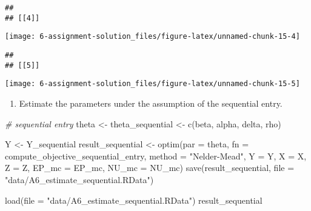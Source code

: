 \documentclass[
]{article}
\newenvironment{Shaded}{\begin{snugshade}}{\end{snugshade}}
\newcommand{\AttributeTok}[1]{\textcolor[rgb]{0.77,0.63,0.00}{#1}}
\newcommand{\CommentTok}[1]{\textcolor[rgb]{0.56,0.35,0.01}{\textit{#1}}}
\newcommand{\FunctionTok}[1]{\textcolor[rgb]{0.00,0.00,0.00}{#1}}
\newcommand{\NormalTok}[1]{#1}
\newcommand{\OtherTok}[1]{\textcolor[rgb]{0.56,0.35,0.01}{#1}}
\newcommand{\StringTok}[1]{\textcolor[rgb]{0.31,0.60,0.02}{#1}}
\providecommand{\tightlist}{%
  \setlength{\itemsep}{0pt}\setlength{\parskip}{0pt}}
\begin{document}
\begin{verbatim}
## 
## [[4]]
\end{verbatim}

\begin{center}\texttt{[image: 6-assignment-solution\_files/figure-latex/unnamed-chunk-15-4]} \end{center}

\begin{verbatim}
## 
## [[5]]
\end{verbatim}

\begin{center}\texttt{[image: 6-assignment-solution\_files/figure-latex/unnamed-chunk-15-5]} \end{center}

\begin{enumerate}
\def\labelenumi{\arabic{enumi}.}
\setcounter{enumi}{5}
\tightlist
\item
  Estimate the parameters under the assumption of the sequential entry.
\end{enumerate}

\begin{Shaded}
\begin{Highlighting}[]
\CommentTok{\# sequential entry}
\NormalTok{theta }\OtherTok{\textless{}{-}}\NormalTok{ theta\_sequential }\OtherTok{\textless{}{-}}
  \FunctionTok{c}\NormalTok{(beta, alpha, delta, rho)}
\end{Highlighting}
\end{Shaded}

\begin{Shaded}
\begin{Highlighting}[]
\NormalTok{Y }\OtherTok{\textless{}{-}}\NormalTok{ Y\_sequential}
\NormalTok{result\_sequential }\OtherTok{\textless{}{-}}
  \FunctionTok{optim}\NormalTok{(}\AttributeTok{par =}\NormalTok{ theta,}
        \AttributeTok{fn =}\NormalTok{ compute\_objective\_sequential\_entry,}
        \AttributeTok{method =} \StringTok{"Nelder{-}Mead"}\NormalTok{,}
        \AttributeTok{Y =}\NormalTok{ Y,}
        \AttributeTok{X =}\NormalTok{ X,}
        \AttributeTok{Z =}\NormalTok{ Z,}
        \AttributeTok{EP\_mc =}\NormalTok{ EP\_mc,}
        \AttributeTok{NU\_mc =}\NormalTok{ NU\_mc)}
\FunctionTok{save}\NormalTok{(result\_sequential, }\AttributeTok{file =} \StringTok{"data/A6\_estimate\_sequential.RData"}\NormalTok{)}
\end{Highlighting}
\end{Shaded}

\begin{Shaded}
\begin{Highlighting}[]
\FunctionTok{load}\NormalTok{(}\AttributeTok{file =} \StringTok{"data/A6\_estimate\_sequential.RData"}\NormalTok{)}
\NormalTok{result\_sequential}
\end{Highlighting}
\end{Shaded}
\end{document}
